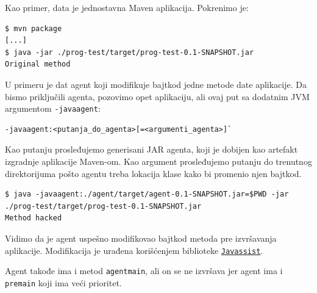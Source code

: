 Kao primer, data je jednostavna Maven aplikacija. Pokrenimo je:

\begin{verbatim}
$ mvn package
[...]
$ java -jar ./prog-test/target/prog-test-0.1-SNAPSHOT.jar
Original method
\end{verbatim}

U primeru je dat agent koji modifikuje bajtkod jedne metode date aplikacije. Da bismo priključili agenta, pozovimo opet aplikaciju, ali ovaj put sa dodatnim JVM argumentom \texttt{-javaagent}:

\begin{verbatim}
-javaagent:<putanja_do_agenta>[=<argumenti_agenta>]`
\end{verbatim}

Kao putanju prosleđujemo generisani JAR agenta, koji je dobijen kao artefakt izgradnje aplikacije Maven-om. Kao argument prosleđujemo putanju do trenutnog direktorijuma pošto agentu treba lokacija klase kako bi promenio njen bajtkod.

\begin{verbatim}
$ java -javaagent:./agent/target/agent-0.1-SNAPSHOT.jar=$PWD -jar ./prog-test/target/prog-test-0.1-SNAPSHOT.jar
Method hacked
\end{verbatim}

Vidimo da je agent uspešno modifikovao bajtkod metoda pre izvršavanja aplikacije. Modifikacija je urađena korišćenjem biblioteke \href{https://www.javassist.org/}{\texttt{Javassist}}.

Agent takođe ima i metod \texttt{agentmain}, ali on se ne izvršava jer agent ima i \texttt{premain} koji ima veći prioritet.
